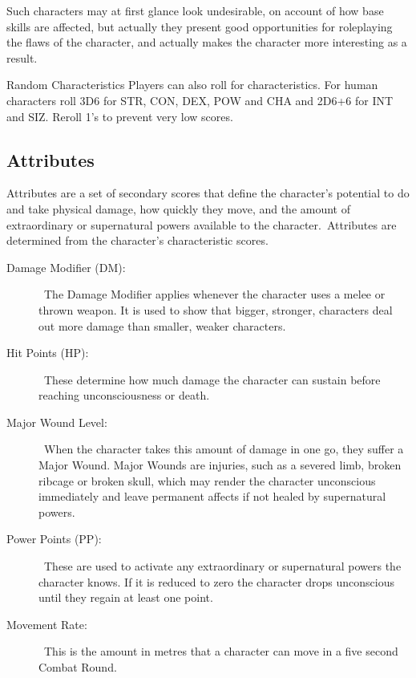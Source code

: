 Such characters may at first glance look undesirable, on account of how base skills are affected, but actually they present good opportunities for roleplaying the flaws of the character, and actually makes the character more interesting as a result.

\vspace{3mm}
\begin{rpg-titlebox}{Random Characteristics}
Players can also roll for characteristics. For human characters roll 3D6 for STR, CON, DEX, POW and CHA and 2D6+6 for INT and SIZ. Reroll 1's to prevent very low scores.
\end{rpg-titlebox}




\subsection{Attributes}
Attributes are a set of secondary scores that define the character’s potential to do and take physical damage, how quickly they move, and the amount of extraordinary or supernatural powers available to the character. Attributes are determined from the character’s characteristic scores. 

\begin{description}
	\item[Damage Modifier (DM):] The Damage Modifier applies whenever the character uses a melee or thrown weapon. It is used to show that bigger, stronger, characters deal out more damage than smaller, weaker characters. 
	\item[Hit Points (HP):] These determine how much damage the character can sustain before reaching unconsciousness or death.
	\item[Major Wound Level:] When the character takes this amount of damage in one go, they suffer a Major Wound. Major Wounds are injuries, such as a severed limb, broken ribcage or broken skull, which may render the character unconscious immediately and leave permanent affects if not healed by supernatural powers.
	\item[Power Points (PP):] These are used to activate any extraordinary or supernatural powers the character knows. If it is reduced to zero the character drops unconscious until they regain at least one point.
	\item[Movement Rate:] This is the amount in metres that a character can move in a five second Combat Round.
\end{description}

